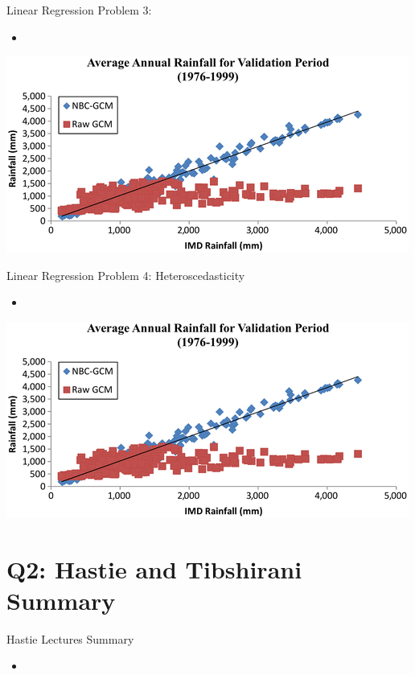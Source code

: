 \documentclass{beamer}
\begin{document}
\begin{frame}{Linear Regression Problem 3: }
	\begin{itemize}
		\item
	\end{itemize}
	\includegraphics[width=0.75\linewidth]{SelectionBias}
\end{frame}

\begin{frame}{Linear Regression Problem 4: Heteroscedasticity}
	\begin{itemize}
		\item
	\end{itemize}
	\includegraphics[width=0.75\linewidth]{SelectionBias}
\end{frame}

\section[Q2]{Q2: Hastie and Tibshirani Summary}

\begin{frame}{Hastie Lectures Summary}
	\begin{itemize}
		\item 
	\end{itemize}
\end{frame}


\end{document}
